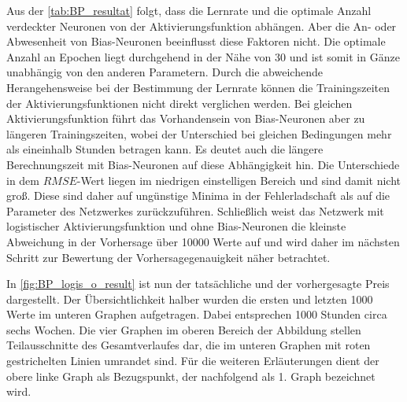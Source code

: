 Aus der \autoref{tab:BP_resultat} folgt, dass die Lernrate und die optimale Anzahl verdeckter Neuronen von der Aktivierungsfunktion abhängen. Aber die An- oder Abwesenheit von Bias-Neuronen beeinflusst diese Faktoren nicht. Die optimale Anzahl an Epochen liegt durchgehend in der Nähe von 30 und ist somit in Gänze unabhängig von den anderen Parametern. Durch die abweichende Herangehensweise bei der Bestimmung der Lernrate können die Trainingszeiten der Aktivierungsfunktionen nicht direkt verglichen werden. Bei gleichen Aktivierungsfunktion führt das Vorhandensein von Bias-Neuronen aber zu längeren Trainingszeiten, wobei der Unterschied bei gleichen Bedingungen mehr als eineinhalb Stunden betragen kann. Es deutet auch die längere Berechnungszeit mit Bias-Neuronen auf diese Abhängigkeit hin. Die Unterschiede in dem $RMSE$-Wert liegen im niedrigen einstelligen Bereich und sind damit nicht groß. Diese sind daher auf ungünstige Minima in der Fehlerladschaft als auf die Parameter des Netzwerkes zurückzuführen. Schließlich weist das Netzwerk mit logistischer Aktivierungsfunktion und ohne Bias-Neuronen die kleinste Abweichung in der Vorhersage über 10000 Werte auf und wird daher im nächsten Schritt zur Bewertung der Vorhersagegenauigkeit näher betrachtet.

In \autoref{fig:BP_logis_o_result} ist nun der tatsächliche und der vorhergesagte Preis dargestellt. Der Übersichtlichkeit halber wurden die ersten und letzten 1000 Werte im unteren Graphen aufgetragen. Dabei entsprechen 1000 Stunden circa sechs Wochen. Die vier Graphen im oberen Bereich der Abbildung stellen Teilausschnitte des Gesamtverlaufes dar, die im unteren Graphen mit roten gestrichelten Linien umrandet sind. Für die weiteren Erläuterungen dient der obere linke Graph als Bezugspunkt, der nachfolgend als 1. Graph bezeichnet wird.

\begin{figure}[!htb]
    \centering
        
    \caption{}
    \label{fig:BP_logis_o_result}
\end{figure}


